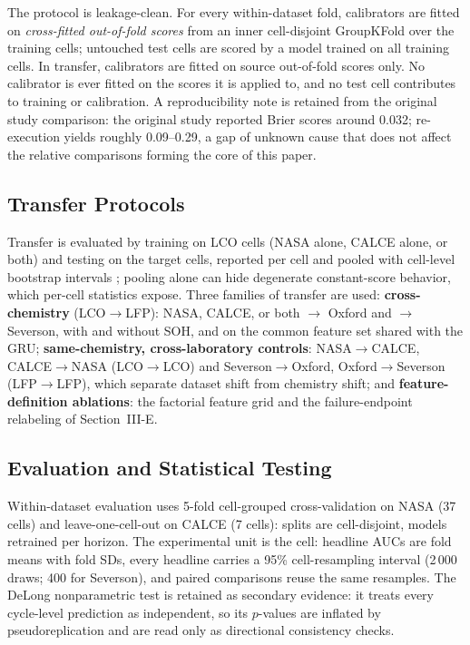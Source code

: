 \documentclass[11pt,a4paper]{article}
\begin{document}
The protocol is leakage-clean. For every within-dataset fold, calibrators are fitted on \emph{cross-fitted out-of-fold scores} from an inner cell-disjoint GroupKFold over the training cells; untouched test cells are scored by a model trained on all training cells. In transfer, calibrators are fitted on source out-of-fold scores only. No calibrator is ever fitted on the scores it is applied to, and no test cell contributes to training or calibration. A reproducibility note is retained from the original study comparison: the original study \cite{shikdar2026learning} reported Brier scores around 0.032; re-execution yields roughly 0.09--0.29, a gap of unknown cause that does not affect the relative comparisons forming the core of this paper.

\subsection{Transfer Protocols}
Transfer is evaluated by training on LCO cells (NASA alone, CALCE alone, or both) and testing on the target cells, reported per cell and pooled with cell-level bootstrap intervals \cite{efron1979bootstrap}; pooling alone can hide degenerate constant-score behavior, which per-cell statistics expose. Three families of transfer are used: \textbf{cross-chemistry} (LCO$\to$LFP): NASA, CALCE, or both $\to$ Oxford and $\to$ Severson, with and without SOH, and on the common feature set shared with the GRU; \textbf{same-chemistry, cross-laboratory controls}: NASA$\to$CALCE, CALCE$\to$NASA (LCO$\to$LCO) and Severson$\to$Oxford, Oxford$\to$Severson (LFP$\to$LFP), which separate dataset shift from chemistry shift; and \textbf{feature-definition ablations}: the factorial feature grid and the failure-endpoint relabeling of Section~III-E.

\subsection{Evaluation and Statistical Testing}
\label{sec:eval}
Within-dataset evaluation uses 5-fold cell-grouped cross-validation on NASA (37 cells) and leave-one-cell-out on CALCE (7 cells): splits are cell-disjoint, models retrained per horizon. The experimental unit is the cell: headline AUCs \cite{hanley1982meaning} are fold means with fold SDs, every headline carries a 95\% cell-resampling interval (2\,000 draws; 400 for Severson), and paired comparisons reuse the same resamples. The DeLong nonparametric test \cite{delong1988comparing} is retained as secondary evidence: it treats every cycle-level prediction as independent, so its $p$-values are inflated by pseudoreplication and are read only as directional consistency checks.
\end{document}
